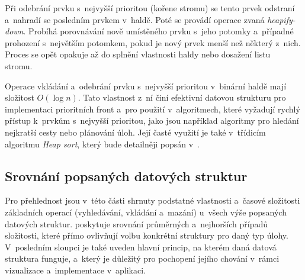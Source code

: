 Při odebrání prvku s~nejvyšší prioritou (kořene stromu) se tento prvek odstraní a~nahradí se posledním prvkem v~haldě.
Poté se provádí operace zvaná \textit{heapify-down}.
Probíhá porovnávání nově umístěného prvku s~jeho potomky a~případné prohození s~největším potomkem, pokud je nový prvek menší než některý z~nich.
Proces se opět opakuje až do splnění vlastnosti haldy nebo dosažení listu stromu.~\cite{levitin}

Operace vkládání a~odebrání prvku s~nejvyšší prioritou v~binární haldě mají složitost $O(\log n)$.
Tato vlastnost z~ní činí efektivní datovou strukturu pro implementaci prioritních front a~pro použití v~algoritmech, které vyžadují rychlý přístup k~prvkům s~nejvyšší prioritou, jako jsou například algoritmy pro hledání nejkratší cesty nebo plánování úloh.
Její časté využití je také v~třídicím algoritmu \textit{Heap sort}, který bude detailněji popsán v~.~\cite{cormen}

\subsection{Srovnání popsaných datových struktur}
\label{sec:data_structures_comparison}

Pro přehlednost jsou v~této části shrnuty podstatné vlastnosti a~časové složitosti základních operací (vyhledávání, vkládání a~mazání) u~všech výše popsaných datových struktur.
 poskytuje srovnání průměrných a~nejhorších případů složitosti, které přímo ovlivňují volbu konkrétní struktury pro daný typ úlohy.
V~posledním sloupci je také uveden hlavní princip, na kterém daná datová struktura funguje, a~který je důležitý pro pochopení jejího chování v~rámci vizualizace a~implementace v~aplikaci.

